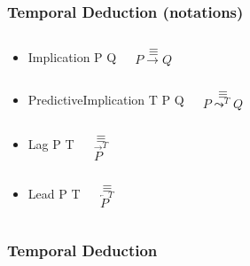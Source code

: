 \documentclass[aspectratio=169]{beamer}
\begin{document}
\begin{frame}[fragile]
  \frametitle{Temporal Deduction \alert{(notations)}}
  \begin{itemize}
  \item<+->
  \begin{columns}
    \column{1in}
\begin{semiverbatim}
Implication
  P
  Q
\end{semiverbatim}
    \column{0.5in}
    $$\equiv$$
    \column{1in}
    $$P \rightarrow Q$$
  \end{columns}
  \item<+->
  \begin{columns}
    \column{1in}
\begin{semiverbatim}
PredictiveImplication
  T
  P
  Q
\end{semiverbatim}
    \column{0.5in}
    $$\equiv$$
    \column{1in}
    $$P \leadsto^T Q$$
  \end{columns}

  \item<+->
  \begin{columns}
    \column{1in}
\begin{semiverbatim}
Lag
  P
  T
\end{semiverbatim}
    \column{0.5in}
    $$\equiv$$
    \column{1in}
    $$\overrightarrow{P}^T$$
  \end{columns}

  \item<+->
  \begin{columns}
    \column{1in}
\begin{semiverbatim}
Lead
  P
  T
\end{semiverbatim}
    \column{0.5in}
    $$\equiv$$
    \column{1in}
    $$\overleftarrow{P}^T$$
  \end{columns}

  \end{itemize}
\end{frame}

\begin{frame}
  \frametitle{Temporal Deduction}
  {\small
    \begin{prooftree}
    \end{prooftree}}

  \pause

    {\small
    \begin{prooftree}
    \end{prooftree}}
\end{frame}
\end{document}
